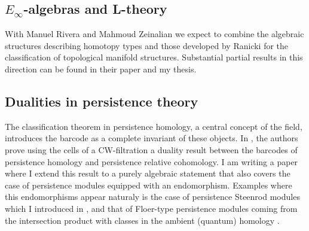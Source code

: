 \subsection{$E_\infty$-algebras and L-theory} With Manuel Rivera and Mahmoud Zeinalian we expect to combine the algebraic structures describing homotopy types \cite{sullivan1977infinitesimal, mandell2001padic} and those developed by Ranicki \cite{ranicki1992topological}  for the classification of topological manifold structures. Substantial partial results in this direction can be found in their paper \cite{rivera2019functor} and my thesis.

\subsection{Dualities in persistence theory} The classification theorem in persistence homology, a central concept of the field, introduces the barcode as a complete invariant of these objects. In \cite{de2011dualities}, the authors prove using the cells of a CW-filtration a duality result between the barcodes of persistence homology and persistence relative cohomology. I am writing a paper where I extend this result to a purely algebraic statement that also covers the case of persistence modules equipped with an endomorphism. Examples where this endomorphisms appear naturaly is the case of persistence Steenrod modules which I introduced in \cite{medina2018persistence}, and that of Floer-type persistence modules  coming  from  the  intersection  product  with  classes  in  the  ambient (quantum) homology \cite{polterovich2017persistence}.